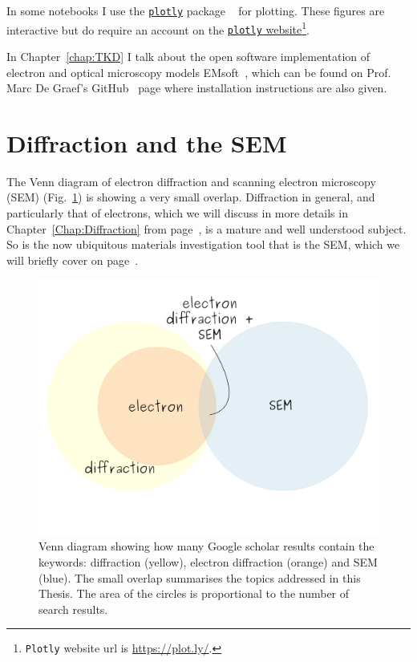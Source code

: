In some notebooks I use the \href{https://plot.ly/}{\texttt{plotly}} package ~\cite{Plotly} for plotting. These figures are interactive but do require an account on the \href{https://plot.ly/}{\texttt{plotly} website}\footnote{ \texttt{Plotly} website url is \href{https://plot.ly/}{https://plot.ly/}.}.  

In Chapter~\ref{chap:TKD} I talk about the open software implementation of electron and optical microscopy models EMsoft~\cite{EMsoftpaper}, which can be found on Prof. Marc De Graef's GitHub~\cite{EMsoft} page where installation instructions are also given.

\section{Diffraction and the SEM}


The Venn diagram of electron diffraction and scanning electron microscopy (SEM) (Fig.~\ref{Fig:Venn}) is showing a very small overlap. Diffraction in general, and particularly that of electrons, which  we will discuss in more details in Chapter~\ref{Chap:Diffraction} from page~\pageref{Chap:Diffraction}, is a mature and well understood subject. So is the now ubiquitous materials investigation tool that is the SEM, which we will briefly cover on page~\pageref{sec:sem}. 

\begin{figure}[ht]
\centering
\includegraphics[width=0.71\linewidth]{Figures/VenSEM.png}
\caption[SEM and electron diffraction Venn diagram.]{Venn diagram showing how many Google scholar results contain the keywords: diffraction (yellow), electron diffraction (orange) and SEM (blue). The small overlap  summarises the topics addressed in this Thesis. The area of the circles is proportional to the number of search results.}
\label{Fig:Venn}
\end{figure}

